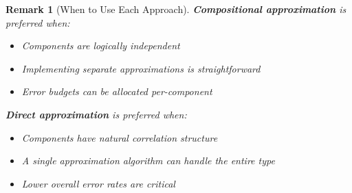 \documentclass[11pt,final,hidelinks]{article}
\newtheorem{remark}[theorem]{Remark}
\begin{document}
\begin{remark}[When to Use Each Approach]
\textbf{Compositional approximation} is preferred when:
\begin{itemize}
    \item Components are logically independent
    \item Implementing separate approximations is straightforward
    \item Error budgets can be allocated per-component
\end{itemize}

\textbf{Direct approximation} is preferred when:
\begin{itemize}
    \item Components have natural correlation structure
    \item A single approximation algorithm can handle the entire type
    \item Lower overall error rates are critical
\end{itemize}
\end{remark}
\end{document}
